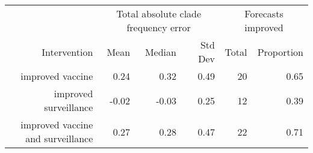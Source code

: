 
\begin{tabular*}{1.0\textwidth}{rrrrrr}
\toprule
             & \multicolumn{3}{c}{Total absolute clade frequency error} & \multicolumn{2}{c}{Forecasts improved} \\
Intervention & Mean & Median & Std Dev & Total & Proportion \\
\midrule

improved vaccine & 0.24 & 0.32 & 0.49 & 20 & 0.65 \\
improved surveillance & -0.02 & -0.03 & 0.25 & 12 & 0.39 \\
improved vaccine and surveillance & 0.27 & 0.28 & 0.47 & 22 & 0.71 \\

\bottomrule
\end{tabular*}

